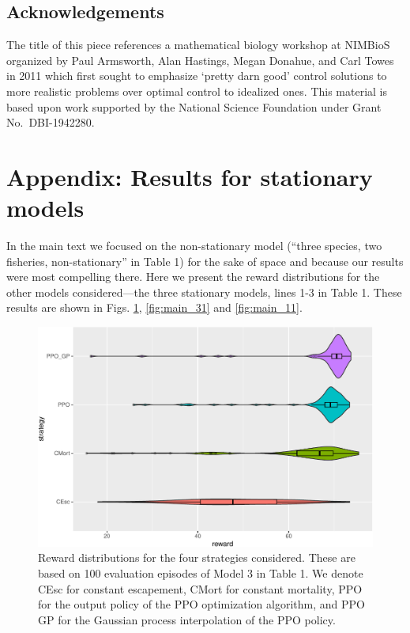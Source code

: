 \documentclass{article}
\begin{document}
\hypertarget{acknowledgements}{%
\subsection{Acknowledgements}\label{acknowledgements}}

The title of this piece references a mathematical biology workshop at
NIMBioS organized by Paul Armsworth, Alan Hastings, Megan Donahue, and
Carl Towes in 2011 which first sought to emphasize `pretty darn good'
control solutions to more realistic problems over optimal control to
idealized ones. This material is based upon work supported by the
National Science Foundation under Grant No.~DBI-1942280.

\appendix

\hypertarget{appendix-results-for-stationary-models}{%
\section{Appendix: Results for stationary
models}\label{appendix-results-for-stationary-models}}

In the main text we focused on the non-stationary model (``three
species, two fisheries, non-stationary'' in Table 1) for the sake of
space and because our results were most compelling there. Here we
present the reward distributions for the other models considered---the
three stationary models, lines 1-3 in Table 1. These results are shown
in Figs. \ref{fig:main_32}, \ref{fig:main_31} and \ref{fig:main_11}.

\begin{figure}
\includegraphics[width=6in]{manuscript_files/figure-latex/main_32-1} \caption{Reward distributions for the four strategies considered. These are based on 100 evaluation episodes of Model 3 in Table 1. We denote CEsc for constant escapement, CMort for constant mortality, PPO for the output policy of the PPO optimization algorithm, and PPO GP for the Gaussian process interpolation of the PPO policy.}\label{fig:main_32}
\end{figure}
\end{document}
